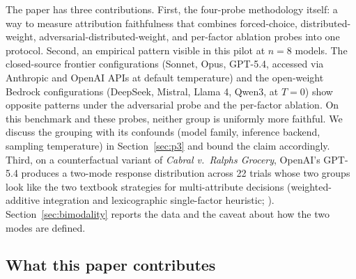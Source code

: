 \documentclass[11pt]{article}
\begin{document}
The paper has three contributions. First, the four-probe methodology itself: a way to measure attribution faithfulness that combines forced-choice, distributed-weight, adversarial-distributed-weight, and per-factor ablation probes into one protocol. Second, an empirical pattern visible in this pilot at $n = 8$ models. The closed-source frontier configurations (Sonnet, Opus, GPT-5.4, accessed via Anthropic and OpenAI APIs at default temperature) and the open-weight Bedrock configurations (DeepSeek, Mistral, Llama 4, Qwen3, at $T = 0$) show opposite patterns under the adversarial probe and the per-factor ablation. On this benchmark and these probes, neither group is uniformly more faithful. We discuss the grouping with its confounds (model family, inference backend, sampling temperature) in Section~\ref{sec:p3} and bound the claim accordingly. Third, on a counterfactual variant of \emph{Cabral v.\ Ralphs Grocery}, OpenAI's GPT-5.4 produces a two-mode response distribution across 22 trials whose two groups look like the two textbook strategies for multi-attribute decisions (weighted-additive integration and lexicographic single-factor heuristic; \citealt{payne1993}). Section~\ref{sec:bimodality} reports the data and the caveat about how the two modes are defined.

\subsection{What this paper contributes}
\end{document}
